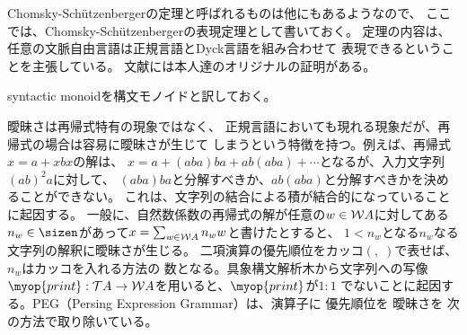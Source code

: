 	\begin{description}\setlength{\itemsep}{-1mm} %
		\item[Chomsky-Shutzenbergerの表現定理] 
		Chomsky-Sch{\"u}tzenbergerの定理と呼ばれるものは他にもあるようなので、
		ここでは、Chomsky-Sch{\"u}tzenbergerの表現定理として書いておく。
		定理の内容は、任意の文脈自由言語は正規言語とDyck言語を組み合わせて
		表現できるということを主張している。
		文献\cite{chomsky:schutzenberger}には本人達のオリジナルの証明がある。
		\item[構文モノイド] syntactic monoidを構文モノイドと訳しておく。
		\item[再帰式における曖昧さ] 曖昧さは再帰式特有の現象ではなく、
		正規言語においても現れる現象だが、再帰式の場合は容易に曖昧さが生じて
		しまうという特徴を持つ。例えば、再帰式$x=a+xbx$の解は、
		$x=a+(aba)ba+ab(aba)+\cdots$となるが、入力文字列$(ab)^2a$に対して、
		$(aba)ba$と分解すべきか、$ab(aba)$と分解すべきかを決めることができない。
		これは、文字列の結合による積が結合的になっていることに起因する。
		一般に、自然数係数の再帰式の解が任意の$w\in\mathcal{W} A$に対してある
		$n_w\in\sizen$があって$x=\sum_{w\in\mathcal{W} A}n_ww$と書けたとすると、
		$1<n_w$となる$n_w$なる文字列の解釈に曖昧さが生じる。
		二項演算の優先順位をカッコ$(,\;)$で表せば、$n_w$はカッコを入れる方法の
		数となる。具象構文解析木から文字列への写像
		$\myop{print}:\Tree A\to \Word A$を用いると、$\myop{print}$が$1:1$
		でないことに起因する。PEG（Persing Expression Grammar）は、演算子に
		優先順位を
		曖昧さを
		次の方法で取り除いている。
	\end{description} %

